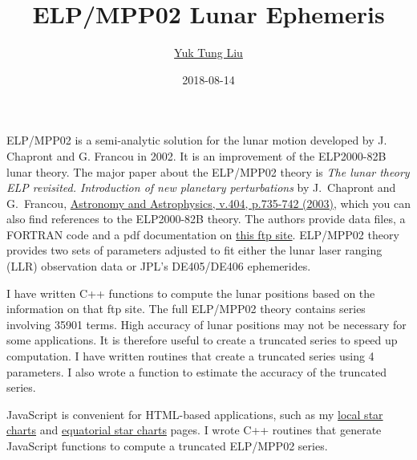 \documentclass[12pt]{article}
\begin{document}
\title{ELP/MPP02 Lunar Ephemeris}
\author{\href{https://publish.illinois.edu/ytliu/}{Yuk Tung Liu}}
\date{2018-08-14}
\maketitle


ELP/MPP02 is a semi-analytic solution for the lunar motion developed by 
J. Chapront and G. Francou in 2002. It is an improvement of the ELP2000-82B 
lunar theory. The major paper about the ELP/MPP02 theory is 
{\it The lunar theory ELP revisited. 
Introduction of new planetary perturbations} by J.\ Chapront and G.\ Francou, 
\href{http://adsabs.harvard.edu/abs/2003A%26A...404..735C}{Astronomy and Astrophysics, 
v.404, p.735-742 (2003)}, which you can also find references to the ELP2000-82B 
theory. The authors provide data files, a FORTRAN code and a 
pdf documentation on \href{ftp://cyrano-se.obspm.fr/pub/2_lunar_solutions/2_elpmpp02/}{this 
ftp site}. ELP/MPP02 theory provides two sets of parameters adjusted to fit 
either the lunar laser ranging (LLR) observation data or JPL's DE405/DE406 
ephemerides.

I have written C++ functions to compute the lunar positions based on  
the information on that ftp site. The full ELP/MPP02 theory contains 
series involving 35901 terms. High accuracy of lunar positions 
may not be necessary for some applications. It is therefore useful to create 
a truncated series to speed up computation. I have written routines 
that create a truncated series using 4 parameters. I 
also wrote a function to estimate the accuracy of the truncated series. 

JavaScript is convenient for HTML-based applications, such as my
\href{https://ytliu0.github.io/starCharts/}{local star charts} and
\href{https://ytliu0.github.io/starCharts/chartGCRS_min.html}{equatorial star
charts} pages. I wrote C++ routines that generate JavaScript functions to compute a truncated ELP/MPP02 series.
\end{document}
